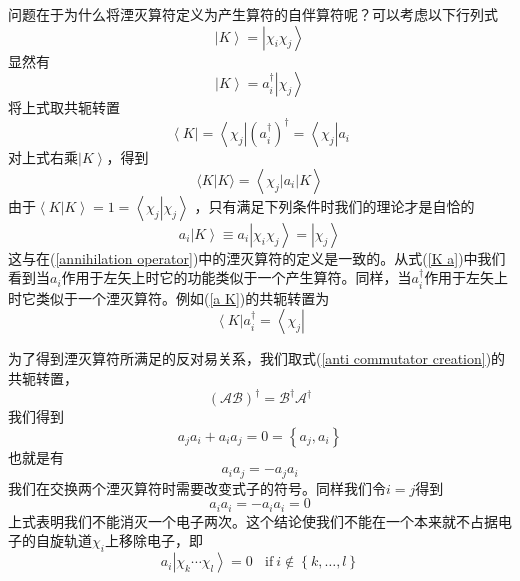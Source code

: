 \documentclass[12pt,a4paper,openany,twoside]{book}
\numberwithin{equation}{section}
\begin{document}
      问题在于为什么将湮灭算符定义为产生算符的自伴算符呢？可以考虑以下行列式
      \begin{equation}
          \left|K\right\rangle=\left|\chi_i\chi_j\right\rangle
      \end{equation}
      显然有
      \begin{equation}
          \left|K\right\rangle=a_i^\dagger\left|\chi_j\right\rangle
      \end{equation}
      将上式取共轭转置
      \begin{equation}
          \left\langle K\right|=\left\langle\chi_j\right|(a_i^\dagger)^\dagger=\left\langle\chi_j\right|a_i
          \label{K a}
      \end{equation}
      对上式右乘$\left|K\right\rangle$，得到
      \begin{equation}
        \langle K | K\rangle=\left\langle\chi_{j}\left|a_{i}\right| K\right\rangle
      \end{equation}
      由于$\left\langle K\right.\left|K\right\rangle=1=\left\langle \chi_j\right.\left|\chi_j\right\rangle$
      ，只有满足下列条件时我们的理论才是自恰的
      \begin{equation}
          a_i\left|K\right\rangle\equiv a_i\left|\chi_i\chi_j\right\rangle=\left|\chi_j\right\rangle
          \label{a K}
      \end{equation}
      这与在(\ref{annihilation operator})中的湮灭算符的定义是一致的。从式(\ref{K a})中我们看到当$a_i$作用于左矢上时它的功能类似于一个产生算符。同样，当$a_i^\dagger$作用于左矢上时它类似于一个湮灭算符。例如(\ref{a K})的共轭转置为
      \begin{equation}
          \left\langle K\right|a_i^\dagger=\left\langle\chi_j\right|
      \end{equation}
      
      为了得到湮灭算符所满足的反对易关系，我们取式(\ref{anti commutator creation})的共轭转置，
      \begin{equation}
          \left(\mathcal{AB}\right)^\dagger=\mathcal{B}^\dagger\mathcal{A}^\dagger
      \end{equation}
      我们得到
      \begin{equation}
          a_j a_i+a_i a_j=0=\left\{a_j, a_i\right\}
          \label{anti commutator annihilation}
      \end{equation}
      也就是有
      \begin{equation}
          a_i a_j=-a_j a_i
      \end{equation}
      我们在交换两个湮灭算符时需要改变式子的符号。同样我们令$i=j$得到
      \begin{equation}
          a_i a_i=-a_i a_i=0
      \end{equation}
      上式表明我们不能消灭一个电子两次。这个结论使我们不能在一个本来就不占据电子的自旋轨道$\chi_i$上移除电子，即
      \begin{equation}
          a_i\left|\chi_k\cdots\chi_l\right\rangle=0\ \ \ \ \mbox{if}\ i\notin
          \left\{k,\ldots,l\right\}
      \end{equation}
      
\end{document}

